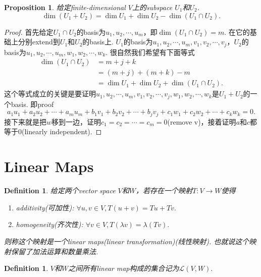 \documentclass{article}
\newtheorem{proposition}[theorem]{Proposition}
\newtheorem{definition}[theorem]{Definition}
\newcommand*{\xfunc}[4]{{#2}\colon{#3}{#1}{#4}}
\newcommand*{\func}[3]{\xfunc{\to}{#1}{#2}{#3}}
\begin{document}
\begin{proposition}
\rm 给定finite-dimensional $V$上的subspace $U_1$和$U_2$. 
$$
	\dim(U_1+U_2) = \dim U_1 + \dim U_2 - \dim(U_1 \cap U_2).
$$
\end{proposition}

\begin{proof}
首先给定$U_1 \cap U_2$的basis为$u_1,u_2,\cdots,u_m$，即$\dim(U_1 \cap U_2)=m$. 在它的基础上分别extend到$U_1$和$U_2$的basis上. $U_1$的basis为$u_1,u_2,\cdots,u_m,v_1,v_2,\cdots,v_j$，$U_2$的basis为$u_1,u_2,\cdots,u_m,w_1,w_2,\cdots,w_k$. 很自然我们希望有下面等式
$$
\begin{aligned} 
\dim(U_1 \cap U_2) &= m + j + k\\
&= (m+j)+(m+k)-m\\
&= \dim U_1+\dim U_2 + \dim(U_1\cap U_2).
\end{aligned}
$$
这个等式成立的关键是要证明$u_1,u_2,\cdots,u_m,v_1,v_2,\cdots,v_j,w_1,w_2,\cdots,w_k$是$U_1 + U_2$的一个basis. 即proof
$$
a_1u_1+a_2u_2+\cdots+a_mu_m + b_1v_1+b_2v_2+\cdots+b_jv_j+c_1w_1+c_2w_2+\cdots+c_kw_k = 0.
$$
接下来就是把$w$移到一边，证明$c_1=c_2=\cdots=c_m=0$(remove v)，接着证明$a$和$c$都等于$0$(linearly independent).
\end{proof}


\newpage
\section{Linear Maps}

\begin{definition}
\rm 给定两个vector space $V$和$W$，若存在一个映射$\func{T}{V}{W}$使得
\begin{enumerate}
	\item additivity(可加性): $\forall u,v \in V,T(u+v)=Tu + Tv.$
	\item homogeneity(齐次性): $\forall v \in V, T(\lambda v) = \lambda (Tv).$
\end{enumerate}
则称这个映射是一个linear maps(linear transformation)(线性映射). 也就说这个映射保留了加法运算和数量乘法. 
\end{definition}

\begin{definition}
\rm $V$和$W$之间所有linear map构成的集合记为$\mathcal{L}(V,W).$
\end{definition}
\end{document}
